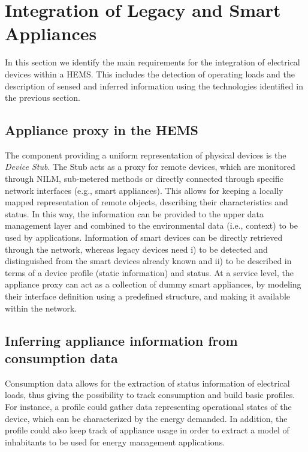 \documentclass{article}
\begin{document}
\section{Integration of Legacy and Smart Appliances}\label{sec:legacyintegration}
In this section we identify the main requirements for the integration of electrical devices within a \ac{HEMS}.
This includes the detection of operating loads and the description of sensed and inferred information using the technologies identified in the previous section.

\subsection{Appliance proxy in the \ac{HEMS}}
The component providing a uniform representation of physical devices is the \textit{Device Stub}.
The Stub acts as a proxy for remote devices, which are monitored through \ac{NILM}, sub-metered methods or directly connected through specific network interfaces (e.g., smart appliances).
This allows for keeping a locally mapped representation of remote objects, describing their characteristics and status.
In this way, the information can be provided to the upper data management layer and combined to the environmental data (i.e., context) to be used by applications.
Information of smart devices can be directly retrieved through the network, whereas legacy devices need i) to be detected and distinguished from the smart devices already known and ii) to be described in terms of a device profile (static information) and status.
At a service level, the appliance proxy can act as a collection of dummy smart appliances,
by modeling their interface definition using a predefined structure, and making it available within the network.
\subsection{Inferring appliance information from consumption data}\label{subsect:inferring}
Consumption data allows for the extraction of status information of electrical loads, thus giving the possibility to track consumption and build basic profiles.
For instance, a profile could gather data representing operational states of the device, which can be characterized by the energy demanded.
In addition, the profile could also keep track of appliance usage in order to extract a model of inhabitants to be used for energy management applications.
\end{document}

